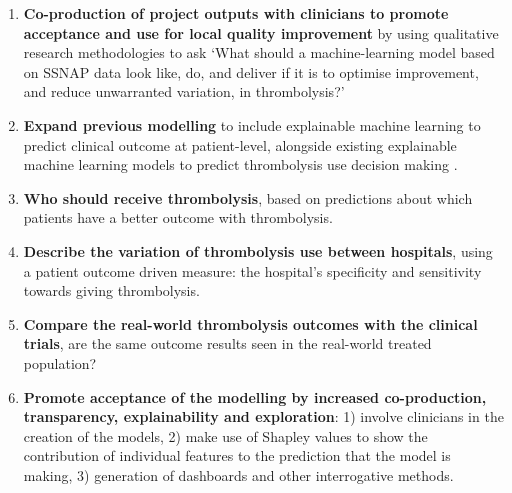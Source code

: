 \begin{enumerate}

    \item \textbf{Co-production of project outputs with clinicians to promote acceptance and use for local quality improvement} by using qualitative research methodologies to ask `What should a machine-learning model based on SSNAP data look like, do, and deliver if it is to optimise improvement, and reduce unwarranted variation, in thrombolysis?'

    \item \textbf{Expand previous modelling} to include explainable machine learning to predict clinical outcome at patient-level, alongside existing explainable machine learning models to predict thrombolysis use decision making \cite{pearn_what_2023}. 

    \item \textbf{Who should receive thrombolysis}, based on predictions about which patients have a better outcome with thrombolysis.

    \item \textbf{Describe the variation of thrombolysis use between hospitals}, using a patient outcome driven measure: the hospital's specificity and sensitivity towards giving thrombolysis.

    \item \textbf{Compare the real-world thrombolysis outcomes with the clinical trials}, are the same outcome results seen in the real-world treated population?

    \item \textbf{Promote acceptance of the modelling by increased co-production, transparency, explainability and exploration}: 1) involve clinicians in the creation of the models, 2) make use of Shapley values to show the contribution of individual features to the prediction that the model is making, 3) generation of dashboards and other interrogative methods.
    
\end{enumerate}